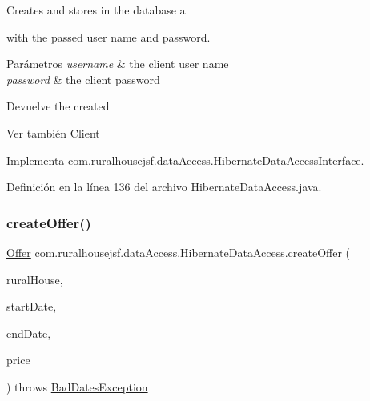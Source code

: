 Creates and stores in the database a
\begin{DoxyCode}{0}
\end{DoxyCode}
 with the passed user name and password.


\begin{DoxyParams}{Parámetros}
{\em username} & the client user name \\
\hline
{\em password} & the client password\\
\hline
\end{DoxyParams}
\begin{DoxyReturn}{Devuelve}
the created
\begin{DoxyCode}{0}
\end{DoxyCode}

\end{DoxyReturn}
\begin{DoxySeeAlso}{Ver también}
Client 
\end{DoxySeeAlso}


Implementa \mbox{\hyperlink{interfacecom_1_1ruralhousejsf_1_1data_access_1_1_hibernate_data_access_interface_a4671ad8ff75ef8a9195974dbdcd95e7f}{com.\+ruralhousejsf.\+data\+Access.\+Hibernate\+Data\+Access\+Interface}}.



Definición en la línea 136 del archivo Hibernate\+Data\+Access.\+java.

\mbox{\label{classcom_1_1ruralhousejsf_1_1data_access_1_1_hibernate_data_access_a332f591a06df13d36814ff215008987b}} 
\subsubsection{\texorpdfstring{createOffer()}{createOffer()}\hspace{0.1cm}{\footnotesize\ttfamily [1/2]}}
{\footnotesize\ttfamily \mbox{\hyperlink{classcom_1_1ruralhousejsf_1_1domain_1_1_offer}{Offer}} com.\+ruralhousejsf.\+data\+Access.\+Hibernate\+Data\+Access.\+create\+Offer (\begin{DoxyParamCaption}\item[{\mbox{\hyperlink{classcom_1_1ruralhousejsf_1_1domain_1_1_rural_house}{Rural\+House}}}]{rural\+House,  }\item[{Local\+Date}]{start\+Date,  }\item[{Local\+Date}]{end\+Date,  }\item[{double}]{price }\end{DoxyParamCaption}) throws \mbox{\hyperlink{classcom_1_1ruralhousejsf_1_1exceptions_1_1_bad_dates_exception}{Bad\+Dates\+Exception}}}

